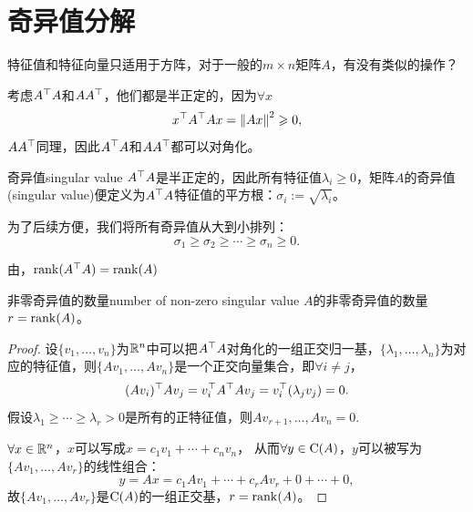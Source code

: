 \chapter{奇异值分解}
特征值和特征向量只适用于方阵，对于一般的$m\times n$矩阵$A$，有没有类似的操作？

\noindent
考虑$A^\top A$和$AA^\top$，他们都是半正定的，因为$\forall x$
\[
	x^\top A^\top Ax=\left\lVert Ax\right\rVert^2\geqslant 0,
\]
$AA^\top$同理，因此$A^\top A$和$AA^\top$都可以对角化。
\begin{definition}{奇异值}{singular value}
	$A^\top A$是半正定的，因此所有特征值$\lambda_i\geqslant 0$，矩阵$A$的奇异值(singular value)便定义为$A^\top A$特征值的平方根：$\sigma_i:=\sqrt{\lambda_i}$。

	为了后续方便，我们将所有奇异值从大到小排列：
	\[
		\sigma_1\geqslant\sigma_2\geqslant\cdots\geqslant\sigma_n\geqslant 0.
	\]
\end{definition}
由，$\operatorname{rank}(A^\top A)=\operatorname{rank}(A)$
\begin{theorem}{非零奇异值的数量}{number of non-zero singular value}
	$A$的非零奇异值的数量$r=\operatorname{rank}(A)$。
\end{theorem}
\begin{proof}
	设$\{v_1,\ldots,v_n\}$为$\mathbb R^n$中可以把$A^\top A$对角化的一组正交归一基，$\{\lambda_1,\ldots,\lambda_n\}$为对应的特征值，则$\{Av_1,\ldots,Av_n\}$是一个正交向量集合，即$\forall i\neq j$，
	\[
		(Av_i)^\top Av_j=v_i^\top A^\top Av_j=v_i^\top(\lambda_jv_j)=0.
	\]
	假设$\lambda_1\geqslant\cdots\geqslant\lambda_r>0$是所有的正特征值，则$Av_{r+1},\ldots,Av_n=0$.
	
	$\forall x\in\mathbb R^n$，$x$可以写成$x=c_1v_1+\cdots+c_nv_n$，
	从而$\forall y\in\operatorname{C}(A)$，$y$可以被写为$\{Av_1,\ldots,Av_r\}$的线性组合：
	\[
		y=Ax=c_1Av_1+\cdots+c_rAv_r+0+\cdots+0,
	\]
	故$\{Av_1,\ldots,Av_r\}$是$\operatorname{C}(A)$的一组正交基，$r=\operatorname{rank}(A)$。
\end{proof}
